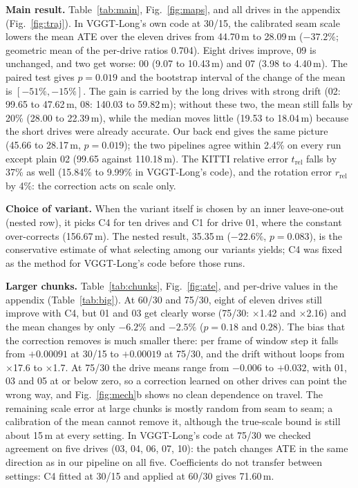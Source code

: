 \documentclass[conference]{IEEEtran}
\begin{document}
\textbf{Main result.} Table~\ref{tab:main}, Fig.~\ref{fig:maps}, and all drives in the appendix (Fig.~\ref{fig:traj}). In VGGT-Long's own code at 30/15, the calibrated seam
scale lowers the mean ATE over the eleven drives from 44.70\,m to 28.09\,m ($-37.2\%$; geometric mean of the per-drive
ratios 0.704). Eight drives improve, 09 is unchanged, and two get worse: 00 (9.07 to 10.43\,m) and 07 (3.98 to
4.40\,m). The paired test gives $p=0.019$ and the bootstrap interval of the change of the mean is $[-51\%,-15\%]$. The
gain is carried by the long drives with strong drift (02: 99.65 to 47.62\,m, 08: 140.03 to 59.82\,m); without these two,
the mean still falls by 20\% (28.00 to 22.39\,m), while the median moves little (19.53 to 18.04\,m) because the short
drives were already accurate. Our back end gives the same picture (45.66 to 28.17\,m, $p=0.019$); the two pipelines
agree within 2.4\% on every run except plain 02 (99.65 against 110.18\,m). The KITTI relative error $t_\mathrm{rel}$
falls by 37\% as well (15.84\% to 9.99\% in VGGT-Long's code), and the rotation error $r_\mathrm{rel}$ by 4\%: the
correction acts on scale only.

\textbf{Choice of variant.} When the variant itself is chosen by an inner leave-one-out (nested row), it picks C4 for ten
drives and C1 for drive 01, where the constant over-corrects (156.67\,m). The nested result, 35.35\,m ($-22.6\%$,
$p=0.083$), is the conservative estimate of what selecting among our variants yields; C4 was fixed as the method for
VGGT-Long's code before those runs.



\textbf{Larger chunks.} Table~\ref{tab:chunks}, Fig.~\ref{fig:ate}, and per-drive values in the appendix
(Table~\ref{tab:big}). At 60/30 and 75/30, eight of eleven drives still improve with C4, but 01 and 03 get clearly worse
(75/30: $\times$1.42 and $\times$2.16) and the mean changes by only $-6.2\%$ and $-2.5\%$ ($p=0.18$ and $0.28$). The
bias that the correction removes is much smaller there: per frame of window step it falls from $+0.00091$ at 30/15 to
$+0.00019$ at 75/30, and the drift without loops from $\times$17.6 to $\times$1.7. At 75/30 the drive means range from
$-0.006$ to $+0.032$, with 01, 03 and 05 at or below zero, so a correction learned on other drives can point the wrong
way, and Fig.~\ref{fig:mech}b shows no clean dependence on travel. The remaining scale error at large chunks is mostly
random from seam to seam; a calibration of the mean cannot remove it, although the true-scale bound is still about
15\,m at every setting. In VGGT-Long's code at 75/30 we checked agreement on five drives (03, 04, 06, 07, 10): the patch
changes ATE in the same direction as in our pipeline on all five. Coefficients do not transfer between settings: C4
fitted at 30/15 and applied at 60/30 gives 71.60\,m.
\end{document}
